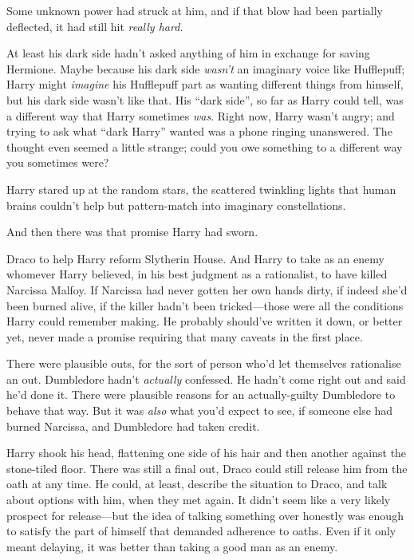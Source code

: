 Some unknown power had struck at him, and if that blow had been
partially deflected, it had still hit \emph{really hard.}

At least his dark side hadn't asked anything of him in exchange for
saving Hermione. Maybe because his dark side \emph{wasn't} an imaginary
voice like Hufflepuff; Harry might \emph{imagine} his Hufflepuff part as
wanting different things from himself, but his dark side wasn't like
that. His ``dark side'', so far as Harry could tell, was a different way
that Harry sometimes \emph{was}. Right now, Harry wasn't angry; and
trying to ask what ``dark Harry'' wanted was a phone ringing unanswered.
The thought even seemed a little strange; could you owe something to a
different way you sometimes were?

Harry stared up at the random stars, the scattered twinkling lights that
human brains couldn't help but pattern-match into imaginary
constellations.

And then there was that promise Harry had sworn.

Draco to help Harry reform Slytherin House. And Harry to take as an
enemy whomever Harry believed, in his best judgment as a rationalist, to
have killed Narcissa Malfoy. If Narcissa had never gotten her own hands
dirty, if indeed she'd been burned alive, if the killer hadn't been
tricked---those were all the conditions Harry could remember making. He
probably should've written it down, or better yet, never made a promise
requiring that many caveats in the first place.

There were plausible outs, for the sort of person who'd let themselves
rationalise an out. Dumbledore hadn't \emph{actually} confessed. He
hadn't come right out and said he'd done it. There were plausible
reasons for an actually-guilty Dumbledore to behave that way. But it was
\emph{also} what you'd expect to see, if someone else had burned
Narcissa, and Dumbledore had taken credit.

Harry shook his head, flattening one side of his hair and then another
against the stone-tiled floor. There was still a final out, Draco could
still release him from the oath at any time. He could, at least,
describe the situation to Draco, and talk about options with him, when
they met again. It didn't seem like a very likely prospect for
release---but the idea of talking something over honestly was enough to
satisfy the part of himself that demanded adherence to oaths. Even if it
only meant delaying, it was better than taking a good man as an enemy.

